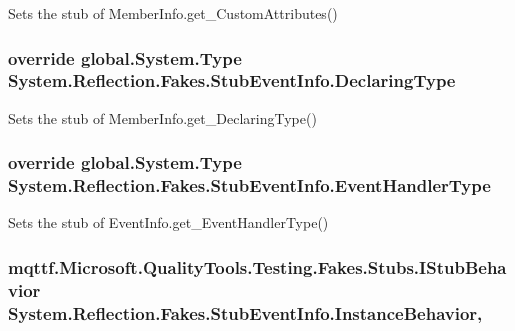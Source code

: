 Sets the stub of Member\-Info.\-get\-\_\-\-Custom\-Attributes()

\hypertarget{class_system_1_1_reflection_1_1_fakes_1_1_stub_event_info_a358982cb962b34927626cc6d204354a6}{
\subsubsection[{Declaring\-Type}]{\setlength{\rightskip}{0pt plus 5cm}override global.\-System.\-Type System.\-Reflection.\-Fakes.\-Stub\-Event\-Info.\-Declaring\-Type\hspace{0.3cm}{\ttfamily [get]}}}\label{class_system_1_1_reflection_1_1_fakes_1_1_stub_event_info_a358982cb962b34927626cc6d204354a6}


Sets the stub of Member\-Info.\-get\-\_\-\-Declaring\-Type()

\hypertarget{class_system_1_1_reflection_1_1_fakes_1_1_stub_event_info_a6524ed454fce5bd281b24719829c206c}{
\subsubsection[{Event\-Handler\-Type}]{\setlength{\rightskip}{0pt plus 5cm}override global.\-System.\-Type System.\-Reflection.\-Fakes.\-Stub\-Event\-Info.\-Event\-Handler\-Type\hspace{0.3cm}{\ttfamily [get]}}}\label{class_system_1_1_reflection_1_1_fakes_1_1_stub_event_info_a6524ed454fce5bd281b24719829c206c}


Sets the stub of Event\-Info.\-get\-\_\-\-Event\-Handler\-Type()

\hypertarget{class_system_1_1_reflection_1_1_fakes_1_1_stub_event_info_a9c46a3f1eb3fc612e861622fc6e3e76e}{
\subsubsection[{Instance\-Behavior}]{\setlength{\rightskip}{0pt plus 5cm}mqttf.\-Microsoft.\-Quality\-Tools.\-Testing.\-Fakes.\-Stubs.\-I\-Stub\-Behavior System.\-Reflection.\-Fakes.\-Stub\-Event\-Info.\-Instance\-Behavior\hspace{0.3cm}{\ttfamily [get]}, {\ttfamily [set]}}}\label{class_system_1_1_reflection_1_1_fakes_1_1_stub_event_info_a9c46a3f1eb3fc612e861622fc6e3e76e}


